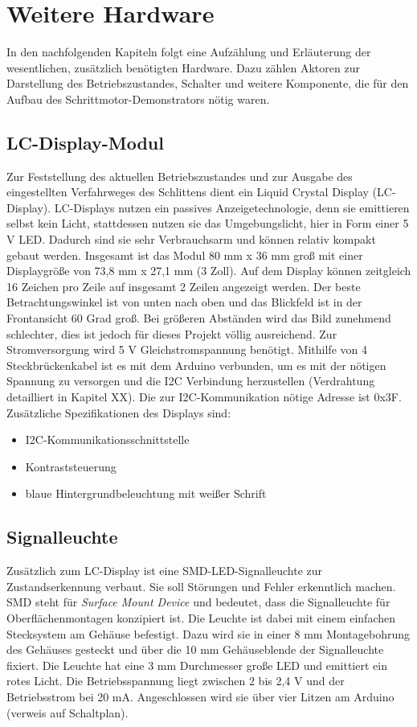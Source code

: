 
\chapter{Weitere Hardware}
In den nachfolgenden Kapiteln folgt eine Aufzählung und Erläuterung der wesentlichen, zusätzlich benötigten Hardware. Dazu zählen Aktoren zur Darstellung des Betriebszustandes, Schalter und weitere Komponente, die für den Aufbau des Schrittmotor-Demonstrators nötig waren.  

\section{LC-Display-Modul}
Zur Feststellung des aktuellen Betriebszustandes und zur Ausgabe des eingestellten Verfahrweges des Schlittens dient ein Liquid Crystal Display (LC-Display). LC-Displays nutzen ein passives Anzeigetechnologie, denn sie emittieren selbst kein Licht, stattdessen nutzen sie das Umgebungslicht, hier in Form einer 5 V LED. Dadurch sind sie sehr Verbrauchsarm und können relativ kompakt gebaut werden.\cite{HTech.2015} Insgesamt ist das Modul 80 mm x 36 mm groß mit einer Displaygröße von 73,8 mm x 27,1 mm (3 Zoll). Auf dem Display können zeitgleich 16 Zeichen pro Zeile auf insgesamt 2 Zeilen angezeigt werden. Der beste Betrachtungswinkel ist von unten nach oben und das Blickfeld ist in der Frontansicht 60 Grad groß. Bei größeren Abständen wird das Bild zunehmend schlechter, dies ist jedoch für dieses Projekt völlig ausreichend. Zur Stromversorgung wird 5 V Gleichstromspannung benötigt. Mithilfe von 4 Steckbrückenkabel ist es mit dem Arduino verbunden, um es mit der nötigen Spannung zu versorgen und die I2C Verbindung herzustellen (Verdrahtung detailliert in Kapitel XX). Die zur I2C-Kommunikation nötige Adresse ist 0x3F. %
Zusätzliche Spezifikationen des Displays sind: 
	\begin{itemize}
		\item I2C-Kommunikationsschnittstelle 
		\item Kontraststeuerung
		\item blaue Hintergrundbeleuchtung mit weißer Schrift
	\end{itemize}
\cite{WaveShare.2007}

\section{Signalleuchte}
Zusätzlich zum LC-Display ist eine SMD-LED-Signalleuchte zur Zustandserkennung verbaut. Sie soll Störungen und Fehler erkenntlich machen. SMD steht für \emph{Surface Mount Device} und bedeutet, dass die Signalleuchte für Oberflächenmontagen konzipiert ist. Die Leuchte ist dabei mit einem einfachen Stecksystem am Gehäuse befestigt. Dazu wird sie in einer 8 mm Montagebohrung des Gehäuses gesteckt und über die 10 mm Gehäuseblende der Signalleuchte fixiert. Die Leuchte hat eine 3 mm Durchmesser große LED und emittiert ein rotes Licht. Die Betriebsspannung liegt zwischen 2 bis 2,4 V und der Betriebsstrom bei 20 mA. Angeschlossen wird sie über vier Litzen am Arduino (verweis auf Schaltplan).\cite{Mentor.2024}

